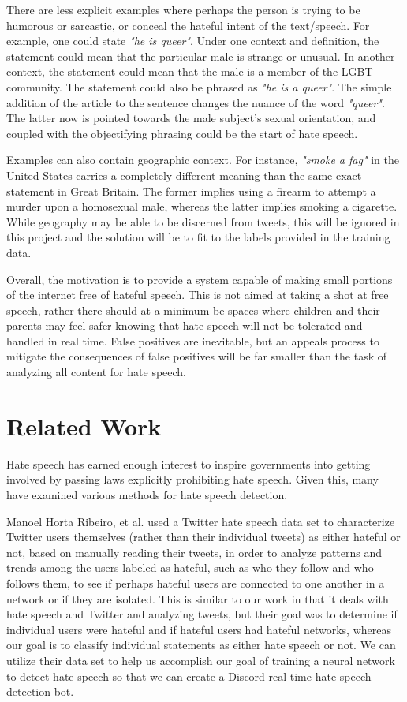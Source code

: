 \documentclass[conference]{sig-alternate-05-2015}
\begin{document}
There are less explicit examples where perhaps the person is trying to be humorous or sarcastic, or conceal the hateful intent of the text/speech.  For example, one could state \textit{"he is queer"}.  Under one context and definition, the statement could mean that the particular male is strange or unusual.  In another context, the statement could mean that the male is a member of the LGBT community. The statement could also be phrased as \textit{"he is a queer"}.  The simple addition of the article to the sentence changes the nuance of the word \textit{"queer"}.  The latter now is pointed towards the male subject's sexual orientation, and coupled with the objectifying phrasing could be the start of hate speech.

Examples can also contain geographic context.  For instance, \textit{"smoke a fag"} in the United States carries a completely different meaning than the same exact statement in Great Britain.  The former implies using a firearm to attempt a murder upon a homosexual male, whereas the latter implies smoking a cigarette.  While geography may be able to be discerned from tweets, this will be ignored in this project and the solution will be to fit to the labels provided in the training data.

Overall, the motivation is to provide a system capable of making small portions of the internet free of hateful speech.  This is not aimed at taking a shot at free speech, rather there should at a minimum be spaces where children and their parents may feel safer knowing that hate speech will not be tolerated and handled in real time.  False positives are inevitable, but an appeals process to mitigate the consequences of false positives will be far smaller than the task of analyzing all content for hate speech.

\section{Related Work}\label{sec:related}

Hate speech has earned enough interest to inspire governments into getting involved\cite{davidson2017automated} by passing laws explicitly prohibiting hate speech.  Given this, many have examined various methods for hate speech detection.

Manoel Horta Ribeiro, et al.\cite{HatefulUsersTwitter}\cite{ribeiro2017like} used a Twitter hate speech data set to characterize Twitter users themselves (rather than their individual tweets) as either hateful or not, based on manually reading their tweets, in order to analyze patterns and trends among the users labeled as hateful, such as who they follow and who follows them, to see if perhaps hateful users are connected to one another in a network or if they are isolated. This is similar to our work in that it deals with hate speech and Twitter and analyzing tweets, but their goal was to determine if individual users were hateful and if hateful users had hateful networks, whereas our goal is to classify individual statements as either hate speech or not. We can utilize their data set to help us accomplish our goal of training a neural network to detect hate speech so that we can create a Discord real-time hate speech detection bot.
\end{document}
